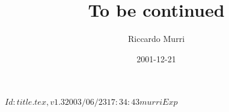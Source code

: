 \RCSID $Id: title.tex,v 1.3 2003/06/23 17:34:43 murri Exp $


\title{To be continued}
\date{2001-12-21}
\author{Riccardo Murri}
\address{%
  Scuola Normale Superiore \\
  p.za dei Cavalieri, 7 \\
  56127 Pisa \\
  Italy
  }

\maketitle

\setcounter{tocdepth}{2} %

\tableofcontents

